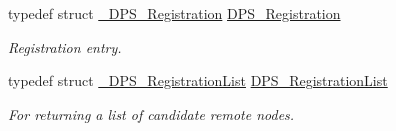 \begin{DoxyCompactItemize}
\mbox{\label{group__registration_gac06db7e10b2626b06bacd09414e7d740}} 
typedef struct \hyperlink{struct___d_p_s___registration}{\+\_\+\+D\+P\+S\+\_\+\+Registration} \hyperlink{group__registration_gac06db7e10b2626b06bacd09414e7d740}{D\+P\+S\+\_\+\+Registration}
\begin{DoxyCompactList}\small\item\em Registration entry. \end{DoxyCompactList}\item 
\mbox{\label{group__registration_ga2b9489ff306ad253d24b03c418a6eda0}} 
typedef struct \hyperlink{struct___d_p_s___registration_list}{\+\_\+\+D\+P\+S\+\_\+\+Registration\+List} \hyperlink{group__registration_ga2b9489ff306ad253d24b03c418a6eda0}{D\+P\+S\+\_\+\+Registration\+List}
\begin{DoxyCompactList}\small\item\em For returning a list of candidate remote nodes. \end{DoxyCompactList}\end{DoxyCompactItemize}
